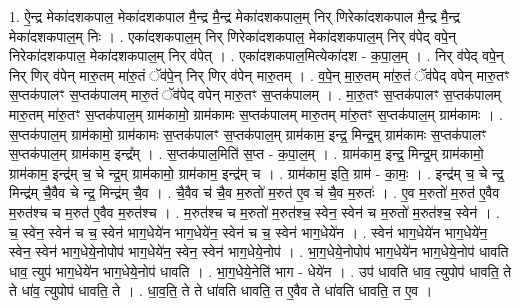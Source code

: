 \documentclass[17pt]{extarticle}
\begin{document}
1. ऐ॒न्द्र मेका॑दशकपाल॒ मेका॑दशकपाल मै॒न्द्र मै॒न्द्र मेका॑दशकपाल॒म् निर् णिरेका॑दशकपाल मै॒न्द्र मै॒न्द्र मेका॑दशकपाल॒म् निः । . एका॑दशकपाल॒म् निर् णिरेका॑दशकपाल॒ मेका॑दशकपाल॒म् निर् व॑पेद् वपे॒न् निरेका॑दशकपाल॒ मेका॑दशकपाल॒म् निर् व॑पेत् । . एका॑दशकपाल॒मित्येका॑दश - क॒पा॒ल॒म् । . निर् व॑पेद् वपे॒न् निर् णिर् व॑पेन् मारु॒तम् मा॑रु॒तं ॅव॑पे॒न् निर् णिर् व॑पेन् मारु॒तम् । . व॒पे॒न् मा॒रु॒तम् मा॑रु॒तं ॅव॑पेद् वपेन् मारु॒तꣳ स॒प्तक॑पालꣳ स॒प्तक॑पालम् मारु॒तं ॅव॑पेद् वपेन् मारु॒तꣳ स॒प्तक॑पालम् । . मा॒रु॒तꣳ स॒प्तक॑पालꣳ स॒प्तक॑पालम् मारु॒तम् मा॑रु॒तꣳ स॒प्तक॑पाल॒म् ग्राम॑कामो॒ ग्राम॑कामः स॒प्तक॑पालम् मारु॒तम् मा॑रु॒तꣳ स॒प्तक॑पाल॒म् ग्राम॑कामः । . स॒प्तक॑पाल॒म् ग्राम॑कामो॒ ग्राम॑कामः स॒प्तक॑पालꣳ स॒प्तक॑पाल॒म् ग्राम॑काम॒ इन्द्र॒ मिन्द्र॒म् ग्राम॑कामः स॒प्तक॑पालꣳ स॒प्तक॑पाल॒म् ग्राम॑काम॒ इन्द्र᳚म् । . स॒प्तक॑पाल॒मिति॑ स॒प्त - क॒पा॒ल॒म् । . ग्राम॑काम॒ इन्द्र॒ मिन्द्र॒म् ग्राम॑कामो॒ ग्राम॑काम॒ इन्द्र॑म् च॒ चे न्द्र॒म् ग्राम॑कामो॒ ग्राम॑काम॒ इन्द्र॑म् च । . ग्राम॑काम॒ इति॒ ग्राम॑ - का॒मः॒ । . इन्द्र॑म् च॒ चे न्द्र॒ मिन्द्र॑म् चै॒वैव चे न्द्र॒ मिन्द्र॑म् चै॒व । . चै॒वैव च॑ चै॒व म॒रुतो॑ म॒रुत॑ ए॒व च॑ चै॒व म॒रुतः॑ । . ए॒व म॒रुतो॑ म॒रुत॑ ए॒वैव म॒रुत॑श्च च म॒रुत॑ ए॒वैव म॒रुत॑श्च । . म॒रुत॑श्च च म॒रुतो॑ म॒रुत॑श्च॒ स्वेन॒ स्वेन॑ च म॒रुतो॑ म॒रुत॑श्च॒ स्वेन॑ । . च॒ स्वेन॒ स्वेन॑ च च॒ स्वेन॑ भाग॒धेये॑न भाग॒धेये॑न॒ स्वेन॑ च च॒ स्वेन॑ भाग॒धेये॑न । . स्वेन॑ भाग॒धेये॑न भाग॒धेये॑न॒ स्वेन॒ स्वेन॑ भाग॒धेये॒नोपोप॑ भाग॒धेये॑न॒ स्वेन॒ स्वेन॑ भाग॒धेये॒नोप॑ । . भा॒ग॒धेये॒नोपोप॑ भाग॒धेये॑न भाग॒धेये॒नोप॑ धावति धाव॒ त्युप॑ भाग॒धेये॑न भाग॒धेये॒नोप॑ धावति । . भा॒ग॒धेये॒नेति॑ भाग - धेये॑न । . उप॑ धावति धाव॒ त्युपोप॑ धावति॒ ते ते धा॑व॒ त्युपोप॑ धावति॒ ते । . धा॒व॒ति॒ ते ते धा॑वति धावति॒ त ए॒वैव ते धा॑वति धावति॒ त ए॒व । \newline
\end{document}
